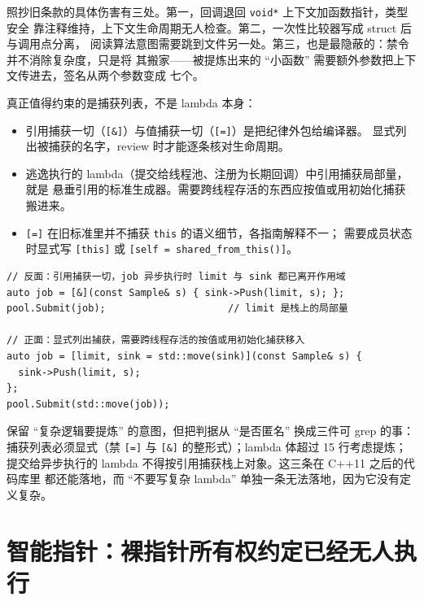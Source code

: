 \documentclass[12pt,a4paper,fontset=fandol]{ctexbook}
\newcommand{\cpp}[1]{C++#1}
\newcommand{\Tp}[1]{\texttt{#1}}
\begin{document}
照抄旧条款的具体伤害有三处。第一，回调退回 \Tp{void*} 上下文加函数指针，类型安全
靠注释维持，上下文生命周期无人检查。第二，一次性比较器写成 struct 后与调用点分离，
阅读算法意图需要跳到文件另一处。第三，也是最隐蔽的：禁令并不消除复杂度，只是将
其搬家——被提炼出来的 ``小函数'' 需要额外参数把上下文传进去，签名从两个参数变成
七个。

真正值得约束的是捕获列表，不是 lambda 本身：

\begin{itemize}
\item 引用捕获一切（\Tp{[\&]}）与值捕获一切（\Tp{[=]}）是把纪律外包给编译器。
  显式列出被捕获的名字，review 时才能逐条核对生命周期。
\item 逃逸执行的 lambda（提交给线程池、注册为长期回调）中引用捕获局部量，就是
  悬垂引用的标准生成器。需要跨线程存活的东西应按值或用初始化捕获搬进来。
\item \Tp{[=]} 在旧标准里并不捕获 \Tp{this} 的语义细节，各指南解释不一；
  需要成员状态时显式写 \Tp{[this]} 或 \Tp{[self = shared\_from\_this()]}。
\end{itemize}

\begin{lstlisting}[style=cppstyle,caption={捕获列表纪律：问题在捕获方式，不在匿名写法},label={lst:ch12-capture}]
// 反面：引用捕获一切，job 异步执行时 limit 与 sink 都已离开作用域
auto job = [&](const Sample& s) { sink->Push(limit, s); };
pool.Submit(job);                     // limit 是栈上的局部量

// 正面：显式列出捕获，需要跨线程存活的按值或用初始化捕获移入
auto job = [limit, sink = std::move(sink)](const Sample& s) {
  sink->Push(limit, s);
};
pool.Submit(std::move(job));
\end{lstlisting}

\begin{bestpractice}[title={给 lambda 条款换一个可检查的判据}]
保留 ``复杂逻辑要提炼'' 的意图，但把判据从 ``是否匿名'' 换成三件可 grep 的事：
捕获列表必须显式（禁 \Tp{[=]} 与 \Tp{[\&]} 的整形式）；lambda 体超过 15 行考虑提炼；
提交给异步执行的 lambda 不得按引用捕获栈上对象。这三条在 \cpp{11} 之后的代码库里
都还能落地，而 ``不要写复杂 lambda'' 单独一条无法落地，因为它没有定义复杂。
\end{bestpractice}

\section{智能指针：裸指针所有权约定已经无人执行}
\label{sec:ch12-smartptr}
\end{document}
